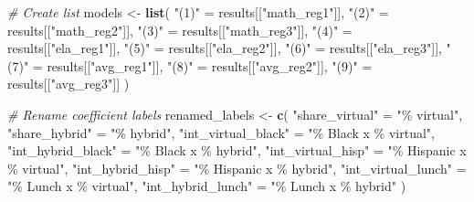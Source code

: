 \documentclass[
]{article}
\newenvironment{Shaded}{\begin{snugshade}}{\end{snugshade}}
\newcommand{\CommentTok}[1]{\textcolor[rgb]{0.56,0.35,0.01}{\textit{#1}}}
\newcommand{\FunctionTok}[1]{\textcolor[rgb]{0.13,0.29,0.53}{\textbf{#1}}}
\newcommand{\NormalTok}[1]{#1}
\newcommand{\OtherTok}[1]{\textcolor[rgb]{0.56,0.35,0.01}{#1}}
\newcommand{\StringTok}[1]{\textcolor[rgb]{0.31,0.60,0.02}{#1}}
\begin{document}
\begin{Shaded}
\begin{Highlighting}[]
\CommentTok{\# Create list}
\NormalTok{models }\OtherTok{\textless{}{-}} \FunctionTok{list}\NormalTok{(}
  \StringTok{"(1)"} \OtherTok{=}\NormalTok{ results[[}\StringTok{"math\_reg1"}\NormalTok{]],}
  \StringTok{"(2)"} \OtherTok{=}\NormalTok{ results[[}\StringTok{"math\_reg2"}\NormalTok{]],}
  \StringTok{"(3)"} \OtherTok{=}\NormalTok{ results[[}\StringTok{"math\_reg3"}\NormalTok{]],}
  \StringTok{"(4)"} \OtherTok{=}\NormalTok{ results[[}\StringTok{"ela\_reg1"}\NormalTok{]],}
  \StringTok{"(5)"} \OtherTok{=}\NormalTok{ results[[}\StringTok{"ela\_reg2"}\NormalTok{]],}
  \StringTok{"(6)"} \OtherTok{=}\NormalTok{ results[[}\StringTok{"ela\_reg3"}\NormalTok{]],}
  \StringTok{"(7)"} \OtherTok{=}\NormalTok{ results[[}\StringTok{"avg\_reg1"}\NormalTok{]],}
  \StringTok{"(8)"} \OtherTok{=}\NormalTok{ results[[}\StringTok{"avg\_reg2"}\NormalTok{]],}
  \StringTok{"(9)"} \OtherTok{=}\NormalTok{ results[[}\StringTok{"avg\_reg3"}\NormalTok{]]}
\NormalTok{)}

\CommentTok{\# Rename coefficient labels}
\NormalTok{renamed\_labels }\OtherTok{\textless{}{-}} \FunctionTok{c}\NormalTok{(}
  \StringTok{"share\_virtual"} \OtherTok{=} \StringTok{"\% virtual"}\NormalTok{,}
  \StringTok{"share\_hybrid"} \OtherTok{=} \StringTok{"\% hybrid"}\NormalTok{,}
  \StringTok{"int\_virtual\_black"} \OtherTok{=} \StringTok{"\% Black x \% virtual"}\NormalTok{,}
  \StringTok{"int\_hybrid\_black"} \OtherTok{=} \StringTok{"\% Black x \% hybrid"}\NormalTok{,}
  \StringTok{"int\_virtual\_hisp"} \OtherTok{=} \StringTok{"\% Hispanic x \% virtual"}\NormalTok{,}
  \StringTok{"int\_hybrid\_hisp"} \OtherTok{=} \StringTok{"\% Hispanic x \% hybrid"}\NormalTok{,}
  \StringTok{"int\_virtual\_lunch"} \OtherTok{=} \StringTok{"\% Lunch x \% virtual"}\NormalTok{,}
  \StringTok{"int\_hybrid\_lunch"} \OtherTok{=} \StringTok{"\% Lunch x \% hybrid"}
\NormalTok{)}


\end{Highlighting}
\end{Shaded}
\end{document}
